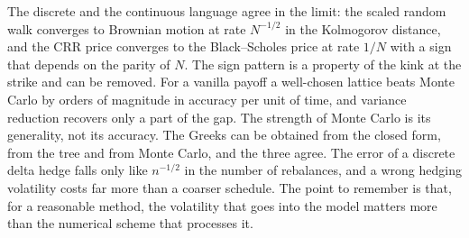 The discrete and the continuous language agree in the limit: the scaled random walk converges to Brownian motion at rate $N^{-1/2}$ in the Kolmogorov distance, and the CRR price converges to the Black--Scholes price at rate $1/N$ with a sign that depends on the parity of $N$.
The sign pattern is a property of the kink at the strike and can be removed.
For a vanilla payoff a well-chosen lattice beats Monte Carlo by orders of magnitude in accuracy per unit of time, and variance reduction recovers only a part of the gap.
The strength of Monte Carlo is its generality, not its accuracy.
The Greeks can be obtained from the closed form, from the tree and from Monte Carlo, and the three agree.
The error of a discrete delta hedge falls only like $n^{-1/2}$ in the number of rebalances, and a wrong hedging volatility costs far more than a coarser schedule.
The point to remember is that, for a reasonable method, the volatility that goes into the model matters more than the numerical scheme that processes it.
